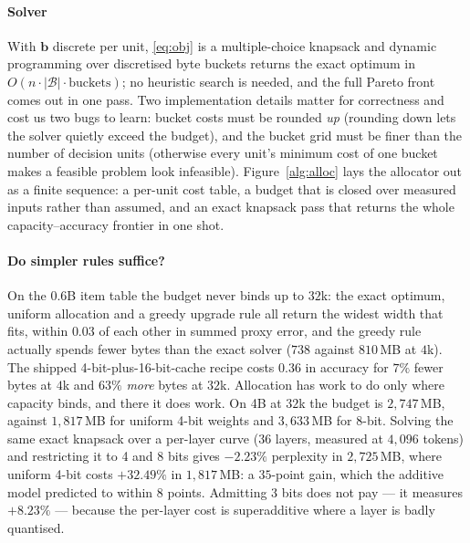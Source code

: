 \documentclass[10pt,journal]{IEEEtran}
\begin{document}
\paragraph*{Solver}
With $\mathbf b$ discrete per unit, \eqref{eq:obj} is a multiple-choice knapsack
and dynamic programming over discretised byte buckets returns the exact optimum
in $O(n \cdot |\mathcal{B}| \cdot \text{buckets})$; no heuristic search is
needed, and the full Pareto front comes out in one pass. Two implementation
details matter for correctness and cost us two bugs to learn: bucket costs must
be rounded \emph{up} (rounding down lets the solver quietly exceed the budget),
and the bucket grid must be finer than the number of decision units (otherwise
every unit's minimum cost of one bucket makes a feasible problem look
infeasible). Figure~\ref{alg:alloc} lays the allocator out as a finite
sequence: a per-unit cost table, a budget that is closed over measured inputs
rather than assumed, and an exact knapsack pass that returns the whole
capacity--accuracy frontier in one shot.

\paragraph*{Do simpler rules suffice?}
On the 0.6B item table the budget never binds up to $32$k: the exact optimum,
uniform allocation and a greedy upgrade rule all return the widest width that
fits, within $0.03$ of each other in summed proxy error, and the greedy rule
actually spends fewer bytes than the exact solver ($738$ against $810$\,MB at
$4$k). The shipped 4-bit-plus-16-bit-cache recipe costs $0.36$ in accuracy for
$7\%$ fewer bytes at $4$k and $63\%$ \emph{more} bytes at $32$k. Allocation
has work to do only where capacity binds, and there it does work. On 4B at $32$k the
budget is $2{,}747$\,MB, against $1{,}817$\,MB for uniform 4-bit weights and
$3{,}633$\,MB for 8-bit. Solving the same exact knapsack over a per-layer curve
(36 layers, measured at $4{,}096$ tokens) and restricting it to 4 and 8 bits gives
$-2.23\%$ perplexity in $2{,}725$\,MB, where uniform 4-bit costs $+32.49\%$ in
$1{,}817$\,MB: a $35$-point gain, which the additive model predicted to within
$8$ points. Admitting 3 bits does not pay --- it measures $+8.23\%$ --- because the
per-layer cost is superadditive where a layer is badly quantised.
\end{document}
